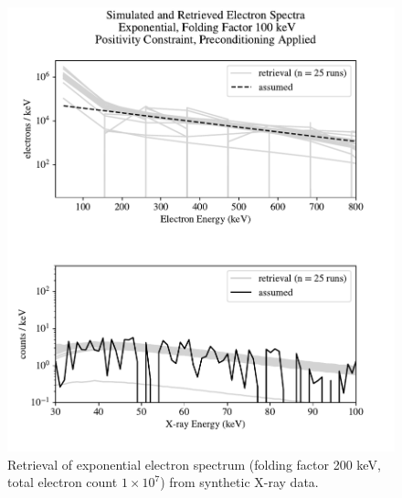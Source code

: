 \begin{figure}[p]
    \centering
    \includegraphics[width=\textwidth]{figures/chapter_4/synthetic_data_examples/exponential_folding_200keV_posonly_preconditioning_1e7_particles}
    \caption{Retrieval of exponential electron spectrum (folding factor 200 keV, total electron count $1\times10^7$) from synthetic X-ray data.}
    \label{why_non_negative_is_good}
\end{figure}

